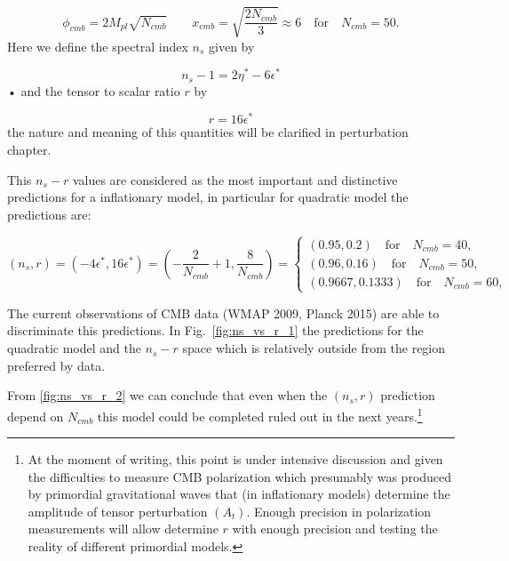 \documentclass[12pt,letterpaper,twoside]{book}
\newcommand\etcomment[1]{\MakeUppercase{\mytexttt{\textcolor{blue}{#1}}}}
\begin{document}
\begin{equation}
    \phi_{cmb} = 2 M_{pl} \sqrt{N_{cmb}} \qquad x_{cmb}
               = \sqrt{ \frac{2 N_{cmb}}{3}}
                 \approx 6 \quad \mbox{for} \quad N_{cmb}=50.
\end{equation}
Here we define the spectral index $n_s$ given by

\begin{equation}
    n_s -1= 2 \eta^* -6 \epsilon^*
\end{equation}•
and the tensor to scalar ratio $r$ by

\begin{equation}
    r=16 \epsilon^*
\end{equation}
the nature and meaning of this quantities will be clarified in perturbation
chapter.


This $n_s -r$ values are considered as the most important and distinctive
predictions for a inflationary model, in particular for quadratic model the
predictions are:

\begin{equation}
    (n_s, r ) = \left(-4\epsilon^*, 16\epsilon^* \right)
              = \left(- \frac{2}{N_{cmb}} + 1 , \frac{8}{N_{cmb}} \right)
              =
    \begin{cases}
        (0.95,0.2) \quad \mbox{for} \quad N_{cmb}=40,\\
        (0.96 , 0.16)\quad \mbox{for} \quad N_{cmb}=50,\\
        (0.9667, 0.1333)\quad \mbox{for} \quad N_{cmb}=60,
    \end{cases}
\end{equation}

The current observations of CMB data (WMAP 2009, Planck 2015) are able to
discriminate this predictions. In Fig.~\ref{fig:ns_vs_r_1} the predictions for
the quadratic model and the $n_s-r$ space which is relatively outside from the
region preferred by data.




From \ref{fig:ns_vs_r_2} we can conclude that even when the $(n_s,r)$ prediction
depend on $N_{cmb}$ this model could be completed ruled out in the next
years.\footnote{\etcomment{this comment Need actualization}At the moment of
    writing, this point is under intensive discussion and given the difficulties
    to measure CMB polarization which presumably was produced by primordial
    gravitational waves that (in inflationary models) determine the amplitude of
    tensor perturbation $(A_t)$.  Enough precision in polarization measurements
    will allow determine $r$ with enough precision and testing the reality of
    different primordial models.}
\end{document}
